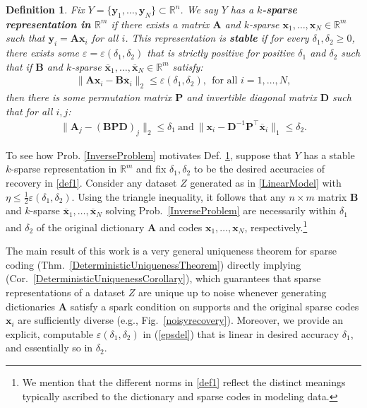 \documentclass[journal, twocolumn]{IEEEtran}
\newtheorem{definition}{Definition}
\begin{document}
\begin{definition}\label{maindef}
Fix $Y = \{ \mathbf{y}_1, \ldots, \mathbf{y}_N\} \subset \mathbb{R}^n$. We say $Y$ has a \textbf{$k$-sparse representation in $\mathbb{R}^m$} if there exists a matrix $\mathbf{A}$ and $k$-sparse $\mathbf{x}_1, \ldots, \mathbf{x}_N \in \mathbb{R}^m$ such that $\mathbf{y}_i = \mathbf{A}\mathbf{x}_i$ for all $i$. 
This representation is \textbf{stable} if for every $\delta_1, \delta_2 \geq 0$, there exists some $\varepsilon = \varepsilon(\delta_1, \delta_2)$ that is strictly positive for positive $\delta_1$ and $\delta_2$ such that if $\mathbf{B}$ and $k$-sparse $\mathbf{\overline x}_1, \ldots, \mathbf{\overline x}_N \in \mathbb{R}^m$ satisfy:
\begin{align*}
	\|\mathbf{A}\mathbf{x}_i - \mathbf{B}\mathbf{\overline x}_i\|_2 \leq \varepsilon(\delta_1, \delta_2),\ \   \text{for all $i=1,\ldots,N$},
\end{align*}
then there is some permutation matrix $\mathbf{P}$ and invertible diagonal matrix $\mathbf{D}$ such that for all $i, j$:
\begin{align}\label{def1}
\|\mathbf{A}_j - (\mathbf{BPD})_j\|_2 \leq \delta_1 \ \text{and} \ \|\mathbf{x}_i - \mathbf{D}^{-1}\mathbf{P}^{\top}\mathbf{\overline x}_i\|_1 \leq \delta_2.
\end{align}
\end{definition}

To see how Prob. \ref{InverseProblem} motivates Def. \ref{maindef}, suppose that $Y$ has a stable $k$-sparse representation in $\mathbb{R}^m$ and fix $\delta_1, \delta_2$ to be the desired accuracies of recovery in \eqref{def1}. Consider any dataset $Z$ generated as in \eqref{LinearModel} with $\eta \leq \frac{1}{2} \varepsilon(\delta_1, \delta_2)$. Using the triangle inequality, it follows that any $n \times m$ matrix $\mathbf{B}$ and $k$-sparse $\mathbf{\overline x}_1, \ldots, \mathbf{\overline x}_N$ solving Prob.~\ref{InverseProblem} are necessarily within $\delta_1$ and $\delta_2$ of the original dictionary $\mathbf{A}$ and codes $\mathbf{x}_1, \ldots, \mathbf{x}_N$, respectively.\footnote{We mention that the different norms in \eqref{def1} reflect the distinct meanings typically ascribed to the dictionary and sparse codes in modeling data.}

The main result of this work is a very general uniqueness theorem for sparse coding (Thm.~\ref{DeterministicUniquenessTheorem}) directly 
implying (Cor.~\ref{DeterministicUniquenessCorollary}), which guarantees that sparse representations of a dataset $Z$ are unique up to noise whenever generating dictionaries $\mathbf{A}$ satisfy a spark condition on supports and the original sparse codes $\mathbf{x}_i$ are sufficiently diverse (e.g., Fig.~\ref{noisyrecovery}).  Moreover, we provide an explicit, computable $\varepsilon(\delta_1, \delta_2)$ in (\ref{epsdel}) that is linear in desired accuracy $\delta_1$, and essentially so in $\delta_2$.
\end{document}
